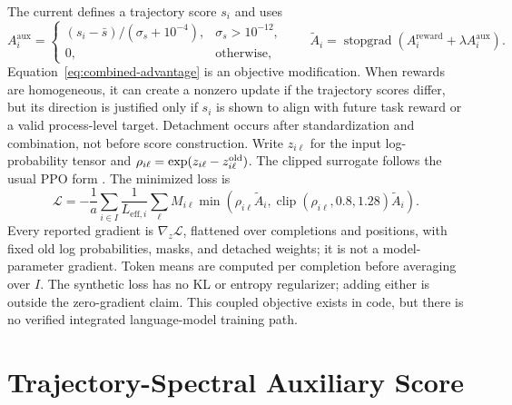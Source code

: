 \documentclass{article}
\begin{document}
The current  defines a trajectory score $s_i$ and uses
\begin{equation}
  A_i^{\mathrm{aux}}
  = \begin{cases}(s_i-\bar s)/(\sigma_s+10^{-4}),&\sigma_s>10^{-12},\\
  0,&\text{otherwise},\end{cases}
  \qquad
  \widetilde A_i
  = \operatorname{stopgrad}\!\left(A_i^{\mathrm{reward}}+\lambda A_i^{\mathrm{aux}}\right).
  \label{eq:combined-advantage}
\end{equation}
Equation~\eqref{eq:combined-advantage} is an objective modification.  When
rewards are homogeneous, it can create a nonzero update if the trajectory
scores differ, but its direction is justified only if $s_i$ is shown to align
with future task reward or a valid process-level target.
Detachment occurs after standardization and combination, not before score
construction. Write $z_{i\ell}$ for the input log-probability tensor and
$\rho_{i\ell}=\exp(z_{i\ell}-z^{\rm old}_{i\ell})$. The clipped
surrogate follows the usual PPO form \citep{schulman2017ppo}. The minimized loss is
\begin{equation}
 \mathcal L=-\frac1a\sum_{i\in I}\frac1{L_{\mathrm{eff},i}}
 \sum_\ell M_{i\ell}\min\!\left(\rho_{i\ell}\widetilde A_i,
 \operatorname{clip}(\rho_{i\ell},0.8,1.28)\widetilde A_i\right).
 \label{eq:surrogate}
\end{equation}
Every reported gradient is $\nabla_z\mathcal L$, flattened over completions
and positions, with fixed old log probabilities, masks, and detached weights;
it is not a model-parameter gradient. Token means are computed per completion
before averaging over $I$. The synthetic loss has no KL or entropy regularizer;
adding either is outside the zero-gradient claim. This coupled objective exists
in code, but there is no verified integrated language-model training path.

\section{Trajectory-Spectral Auxiliary Score}
\label{sec:score}
\end{document}
